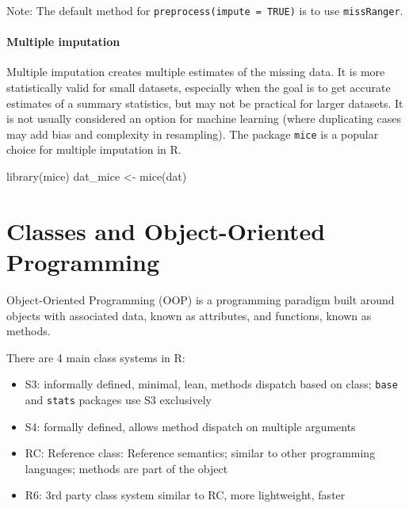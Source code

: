 \documentclass[
]{book}
\newenvironment{Shaded}{\begin{snugshade}}{\end{snugshade}}
\newcommand{\FunctionTok}[1]{\textcolor[rgb]{0.00,0.00,0.00}{#1}}
\newcommand{\NormalTok}[1]{#1}
\newcommand{\OtherTok}[1]{\textcolor[rgb]{0.56,0.35,0.01}{#1}}
\providecommand{\tightlist}{%
  \setlength{\itemsep}{0pt}\setlength{\parskip}{0pt}}
\begin{document}
Note: The default method for \texttt{preprocess(impute\ =\ TRUE)} is to use \texttt{missRanger}.

\hypertarget{multiple-imputation}{%
\subsubsection{Multiple imputation}\label{multiple-imputation}}

Multiple imputation creates multiple estimates of the missing data. It is more statistically valid for small datasets, especially when the goal is to get accurate estimates of a summary statistics, but may not be practical for larger datasets. It is not usually considered an option for machine learning (where duplicating cases may add bias and complexity in resampling). The package \texttt{mice} is a popular choice for multiple imputation in R.

\begin{Shaded}
\begin{Highlighting}[]
\FunctionTok{library}\NormalTok{(mice)}
\NormalTok{dat\_mice }\OtherTok{\textless{}{-}} \FunctionTok{mice}\NormalTok{(dat)}
\end{Highlighting}
\end{Shaded}

\hypertarget{classes}{%
\chapter{Classes and Object-Oriented Programming}\label{classes}}

Object-Oriented Programming (OOP) is a programming paradigm built around objects with associated data, known as attributes, and functions, known as methods.

There are 4 main class systems in R:

\begin{itemize}
\tightlist
\item
  S3: informally defined, minimal, lean, methods dispatch based on class; \texttt{base} and \texttt{stats} packages use S3 exclusively
\item
  S4: formally defined, allows method dispatch on multiple arguments
\item
  RC: Reference class: Reference semantics; similar to other programming languages; methods are part of the object
\item
  R6: 3rd party class system similar to RC, more lightweight, faster
\end{itemize}
\end{document}

